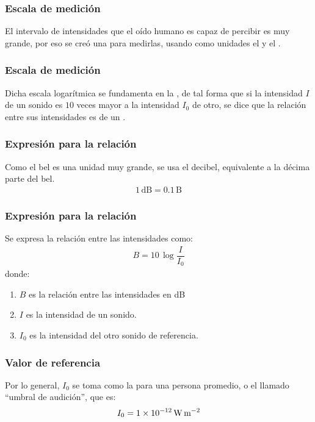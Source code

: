 \documentclass[14pt]{beamer}
\begin{document}
\begin{frame}
\frametitle{Escala de medición}
El intervalo de intensidades que el oído humano es capaz de percibir es muy grande, \pause por eso se creó una  para medirlas, usando como unidades el  y el .
\end{frame}
\begin{frame}
\frametitle{Escala de medición}
Dicha escala logarítmica se fundamenta en la , \pause de tal forma que si la intensidad $I$ de un sonido es $10$ veces mayor a la intensidad $I_{0}$ de otro, \pause se dice que la relación entre sus intensidades es de un .
\end{frame}
\begin{frame}
\frametitle{Expresión para la relación}
Como el bel es una unidad muy grande, \pause se usa el decibel, equivalente a la décima parte del bel.
\pause
\begin{align*}
1 \, \text{dB} = 0.1 \, \text{B}
\end{align*}
\end{frame}
\begin{frame}
\frametitle{Expresión para la relación}
Se expresa la relación entre las intensidades como:
\pause
\begin{align*}
B = 10 \, \log \dfrac{I}{I_{0}}
\end{align*}
donde:
\begin{enumerate}[<+->]
\item $B$ es la relación entre las intensidades en \si{\dB}
\item $I$ es la intensidad de un sonido.
\item $I_{0}$ es la intensidad del otro sonido de referencia.
\end{enumerate}
\end{frame}
\begin{frame}
\frametitle{Valor de referencia}
Por lo general, $I_{0}$ se toma como la  para una persona promedio, o el llamado \enquote{umbral de audición}, \pause que es:
\pause
\begin{align*}
I_{0} = \SI{1d-12}{\watt\per\square\meter}
\end{align*}
\end{frame}
\end{document}
